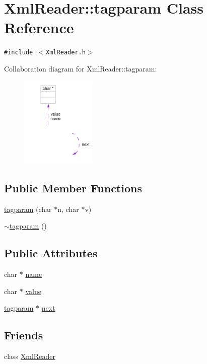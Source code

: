 \hypertarget{classXmlReader_1_1tagparam}{
\section{Xml\-Reader::tagparam Class Reference}
\label{classXmlReader_1_1tagparam}
}
{\tt \#include $<$Xml\-Reader.h$>$}

Collaboration diagram for Xml\-Reader::tagparam:\begin{figure}[H]
\begin{center}
\leavevmode
\includegraphics[width=101pt]{classXmlReader_1_1tagparam__coll__graph}
\end{center}
\end{figure}
\subsection*{Public Member Functions}
\begin{CompactItemize}
\item 
\hyperlink{classXmlReader_1_1tagparam_a0}{tagparam} (char $\ast$n, char $\ast$v)
\item 
\hyperlink{classXmlReader_1_1tagparam_a1}{$\sim$tagparam} ()
\end{CompactItemize}
\subsection*{Public Attributes}
\begin{CompactItemize}
\item 
char $\ast$ \hyperlink{classXmlReader_1_1tagparam_o0}{name}
\item 
char $\ast$ \hyperlink{classXmlReader_1_1tagparam_o1}{value}
\item 
\hyperlink{classXmlReader_1_1tagparam}{tagparam} $\ast$ \hyperlink{classXmlReader_1_1tagparam_o2}{next}
\end{CompactItemize}
\subsection*{Friends}
\begin{CompactItemize}
\item 
class \hyperlink{classXmlReader_1_1tagparam_n0}{Xml\-Reader}
\end{CompactItemize}


